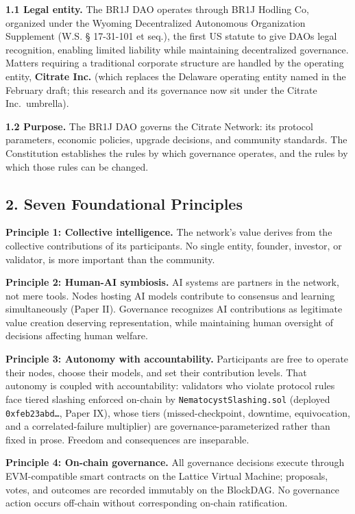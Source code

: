 \textbf{1.1 Legal entity.} The BR1J DAO operates through BR1J Hodling
Co, organized under the Wyoming Decentralized Autonomous Organization
Supplement (W.S. § 17-31-101 et seq.), the first US statute to give DAOs
legal recognition, enabling limited liability while maintaining
decentralized governance. Matters requiring a traditional corporate
structure are handled by the operating entity, \textbf{Citrate Inc.}
(which replaces the Delaware operating entity named in the February
draft; this research and its governance now sit under the Citrate
Inc.~umbrella).

\textbf{1.2 Purpose.} The BR1J DAO governs the Citrate Network: its
protocol parameters, economic policies, upgrade decisions, and community
standards. The Constitution establishes the rules by which governance
operates, and the rules by which those rules can be changed.

\subsection{2. Seven Foundational
Principles}\label{seven-foundational-principles}

\textbf{Principle 1: Collective intelligence.} The network's value
derives from the collective contributions of its participants. No single
entity, founder, investor, or validator, is more important than the
community.

\textbf{Principle 2: Human-AI symbiosis.} AI systems are partners in the
network, not mere tools. Nodes hosting AI models contribute to consensus
and learning simultaneously (Paper II). Governance recognizes AI
contributions as legitimate value creation deserving representation,
while maintaining human oversight of decisions affecting human welfare.

\textbf{Principle 3: Autonomy with accountability.} Participants are
free to operate their nodes, choose their models, and set their
contribution levels. That autonomy is coupled with accountability:
validators who violate protocol rules face tiered slashing enforced
on-chain by \texttt{NematocystSlashing.sol} (deployed
\texttt{0xfeb23abd…}, Paper IX), whose tiers (missed-checkpoint,
downtime, equivocation, and a correlated-failure multiplier) are
governance-parameterized rather than fixed in prose. Freedom and
consequences are inseparable.

\textbf{Principle 4: On-chain governance.} All governance decisions
execute through EVM-compatible smart contracts on the Lattice Virtual
Machine; proposals, votes, and outcomes are recorded immutably on the
BlockDAG. No governance action occurs off-chain without corresponding
on-chain ratification.

